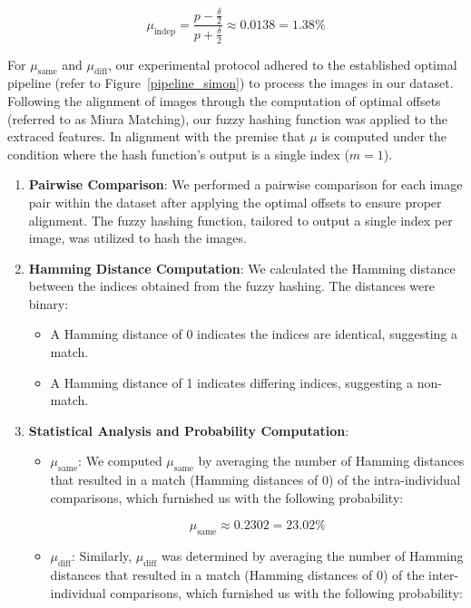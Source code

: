 \[
    \mu_{\text{indep}} = \frac{p - \frac{\delta}{2}}{p + \frac{\delta}{2}} \approx 0.0138 = 1.38\%
\]

For \(\mu_{\text{same}}\) and \(\mu_{\text{diff}}\), our experimental protocol adhered to the established optimal pipeline (refer to Figure~\ref{pipeline_simon}) to process the images in our dataset. Following the alignment of images through the computation of optimal offsets (referred to as Miura Matching), our fuzzy hashing function was applied to the extraced features. In alignment with the premise that \(\mu\) is computed under the condition where the hash function's output is a single index (\(m=1\)).

\begin{enumerate}
    \item \textbf{Pairwise Comparison}: We performed a pairwise comparison for each image pair within the dataset after applying the optimal offsets to ensure proper alignment. The fuzzy hashing function, tailored to output a single index per image, was utilized to hash the images.

    \item \textbf{Hamming Distance Computation}: We calculated the Hamming distance between the indices obtained from the fuzzy hashing. The distances were binary:
    \begin{itemize}
        \item A Hamming distance of 0 indicates the indices are identical, suggesting a match.
        \item A Hamming distance of 1 indicates differing indices, suggesting a non-match.
    \end{itemize}
    
    \item \textbf{Statistical Analysis and Probability Computation}:
    \begin{itemize}
        \item \textbf{\(\mu_{\text{same}}\)}: We computed \(\mu_{\text{same}}\) by averaging the number of Hamming distances that resulted in a match (Hamming distances of 0) of the intra-individual comparisons, which furnished us with the following probability:

        \[ \mu_{\text{same}} \approx 0.2302 = 23.02\%\]
        
        \item \textbf{\(\mu_{\text{diff}}\)}: Similarly, \(\mu_{\text{diff}}\) was determined by averaging the number of Hamming distances that resulted in a match (Hamming distances of 0) of the inter-individual comparisons, which furnished us with the following probability:


\end{itemize}
\end{enumerate}
